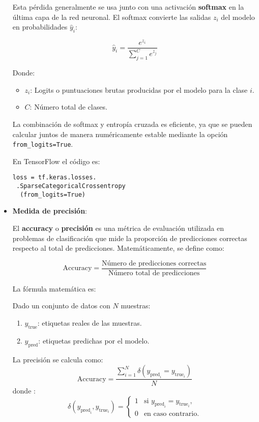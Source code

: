 \documentclass[../main.tex]{subfiles}
\begin{document}
\begin{itemize}
  Esta pérdida generalmente se usa junto con una activación \textbf{ softmax} en la última capa de la red neuronal. El softmax convierte las salidas \(z_i\) del modelo en probabilidades \(\hat{y}_i\):

  \[
  \hat{y}_i = \frac{e^{z_i}}{\sum_{j=1}^{C} e^{z_j}}
  \]

  Donde:

  \begin{itemize}
      \item \(z_i\): Logits o puntuaciones brutas producidas por el modelo para la clase \(i\).
      \item \(C\): Número total de clases.
  \end{itemize}

  La combinación de softmax y entropía cruzada es eficiente, ya que se pueden calcular juntos de manera numéricamente estable mediante la opción \texttt{from\_logits=True}.

  En TensorFlow el código es:

  \begin{verbatim}
loss = tf.keras.losses.
 .SparseCategoricalCrossentropy
  (from_logits=True) 
  \end{verbatim}

  \item \textbf{Medida de precisión}:
   
  El \textbf{accuracy} o \textbf{precisión} es una métrica de evaluación utilizada en problemas de clasificación que mide la proporción de predicciones correctas respecto al total de predicciones. Matemáticamente, se define como:

  \[
  \text{Accuracy} = \frac{\text{Número de predicciones correctas}}{\text{Número total de predicciones}}
  \]

  La fórmula matemática es:

  Dado un conjunto de datos con \( N \) muestras:

  \begin{enumerate}
      \item \( y_{\text{true}} \): etiquetas reales de las muestras.
      \item \( y_{\text{pred}} \): etiquetas predichas por el modelo.
  \end{enumerate}

  La precisión se calcula como:
  \[
  \text{Accuracy} = \frac{\sum_{i=1}^{N} \delta(y_{\text{pred}_i} = y_{\text{true}_i})}{N}
  \]
  donde
  :
  \[
  \delta(y_{\text{pred}_i}, y_{\text{true}_i}) = 
  \begin{cases} 
    1 & \text{si } y_{\text{pred}_i} = y_{\text{true}_i}, \\
    0 & \text{en caso contrario.}
  \end{cases}
  \]


\end{itemize}
\end{document}
